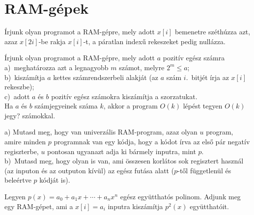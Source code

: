 \chapter{RAM-g\'epek}

\begin{Exercise}[counter={sorszam}, difficulty=0]
	Írjunk olyan programot a RAM-gépre, mely adott $x[i]$ bemenetre sz\'eth\'uzza azt, azaz $x[2i]$-be rakja $x[i]$-t, a p\'aratlan index\H u rekeszeket pedig null\'azza.
\end{Exercise}		 

\begin{Exercise}[counter={sorszam}, difficulty=0]
	Írjunk olyan programot a RAM-gépre, mely adott $a$ pozitív egész számra\\
	a)~meghatározza azt a legnagyobb $m$ számot, melyre $2^m \le a$;\\
	b)~kiszámítja $a$ kettes számrendszerbeli alakját (az $a$ szám $i$.\ bitjét írja az $x[i]$ rekeszbe);\\
	c)~adott $a$ és $b$ pozitív egész számokra kiszámítja a szorzatukat.\\
	Ha $a$ és $b$ számjegyeinek száma $k$, akkor a program $O(k)$ lépést tegyen $O(k)$ jegy? számokkal.
\end{Exercise}	

\begin{Exercise}[counter={sorszam}, difficulty=0]
	a) Mutasd meg, hogy van univerz\'alis RAM-program, azaz olyan $u$ program, amire minden $p$ programnak van egy k\'odja, hogy a k\'odot \'irva az els\H o p\'ar negat\'iv regiszterbe, $u$ pontosan ugyanazt adja ki b\'armely inputra, mint $p$.\\
	b)~\hard Mutasd meg, hogy olyan is van, ami \"osszesen korl\'atos sok regisztert haszn\'al (az inputon \'es az outputon k\'iv\"ul) az eg\'esz fut\'asa alatt ($p$-t\H ol f\"uggetlen\"ul \'es bele\'ertve $p$ k\'odj\'at is).
\end{Exercise}		

\begin{Exercise}[counter={sorszam}, difficulty=0]
	Legyen $p(x)=a_0 + a_1 x +\cdots + a_n x^n$ eg\'esz egy\"utthat\'os polinom. Adjunk meg egy RAM-g\'epet, ami a $x[i]=a_i$ inputra kisz\'am\'itja $p^2(x)$ egy\"utthat\'oit.
\end{Exercise}		 

